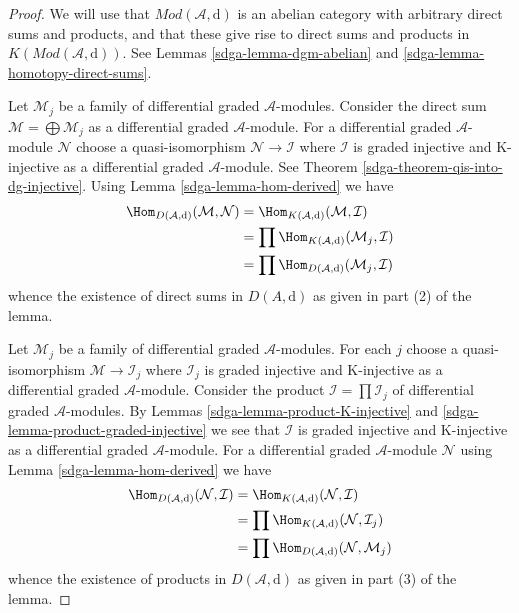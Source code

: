 \begin{proof}

We will use that $\textit{Mod}(\mathcal{A}, \text{d})$ is an abelian category
with arbitrary direct sums and products, and that these give rise
to direct sums and products in $K(\textit{Mod}(\mathcal{A}, \text{d}))$.
See Lemmas \ref{sdga-lemma-dgm-abelian} and \ref{sdga-lemma-homotopy-direct-sums}.

\medskip\noindent
Let $\mathcal{M}_j$ be a family of differential graded $\mathcal{A}$-modules.
Consider the direct sum $\mathcal{M} = \bigoplus \mathcal{M}_j$
as a differential graded $\mathcal{A}$-module.
For a differential graded $\mathcal{A}$-module
$\mathcal{N}$ choose a quasi-isomorphism
$\mathcal{N} \to \mathcal{I}$ where
$\mathcal{I}$ is graded injective and K-injective as a
differential graded $\mathcal{A}$-module. See
Theorem \ref{sdga-theorem-qis-into-dg-injective}.
Using Lemma \ref{sdga-lemma-hom-derived} we have
\begin{align*}
\Hom_{D(\mathcal{A}, \text{d})}(\mathcal{M}, \mathcal{N})
& =
\Hom_{K(\mathcal{A}, \text{d})}(\mathcal{M}, \mathcal{I}) \\
& =
\prod \Hom_{K(\mathcal{A}, \text{d})}(\mathcal{M}_j, \mathcal{I}) \\
& =
\prod \Hom_{D(\mathcal{A}, \text{d})}(\mathcal{M}_j, \mathcal{I})
\end{align*}
whence the existence of direct sums in $D(A, \text{d})$ as given in
part (2) of the lemma.

\medskip\noindent
Let $\mathcal{M}_j$ be a family of differential graded $\mathcal{A}$-modules.
For each $j$ choose a quasi-isomorphism
$\mathcal{M} \to \mathcal{I}_j$ where
$\mathcal{I}_j$ is graded injective and K-injective as a
differential graded $\mathcal{A}$-module.
Consider the product $\mathcal{I} = \prod \mathcal{I}_j$
of differential graded $\mathcal{A}$-modules.
By Lemmas \ref{sdga-lemma-product-K-injective} and
\ref{sdga-lemma-product-graded-injective} we see that
$\mathcal{I}$ is graded injective and K-injective as a
differential graded $\mathcal{A}$-module.
For a differential graded $\mathcal{A}$-module
$\mathcal{N}$ using Lemma \ref{sdga-lemma-hom-derived} we have
\begin{align*}
\Hom_{D(\mathcal{A}, \text{d})}(\mathcal{N}, \mathcal{I})
& =
\Hom_{K(\mathcal{A}, \text{d})}(\mathcal{N}, \mathcal{I}) \\
& =
\prod \Hom_{K(\mathcal{A}, \text{d})}(\mathcal{N}, \mathcal{I}_j) \\
& =
\prod \Hom_{D(\mathcal{A}, \text{d})}(\mathcal{N}, \mathcal{M}_j)
\end{align*}
whence the existence of products in $D(\mathcal{A}, \text{d})$ as given in
part (3) of the lemma.
\end{proof}

